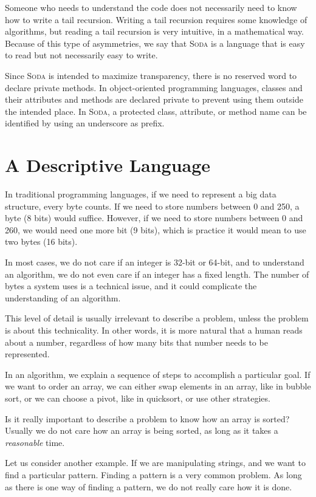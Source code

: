 \documentclass[12pt,a4paper]{book}
\newcommand{\Soda}{\textsc{Soda}\xspace}
\begin{document}
    Someone who needs to understand the code does not necessarily need to know how to write a tail recursion.
    Writing a tail recursion requires some knowledge of algorithms, but reading a tail recursion is very intuitive, in a mathematical way.
    Because of this type of asymmetries, we say that \Soda is a language that is easy to read but not necessarily easy to write.

    Since \Soda is intended to maximize transparency, there is no reserved word to declare private methods.
    In object-oriented programming languages, classes and their attributes and methods are declared private to prevent using them outside the intended place.
    In \Soda, a protected class, attribute, or method name can be identified by using an underscore as prefix.


    \section{A Descriptive Language}

    In traditional programming languages, if we need to represent a big data structure, every byte counts.
    If we need to store numbers between 0 and 250, a byte (8 bits) would suffice.
    However, if we need to store numbers between 0 and 260, we would need one more bit (9 bits), which is practice it would mean to use two bytes (16 bits).

    In most cases, we do not care if an integer is 32-bit or 64-bit, and to understand an algorithm, we do not even care if an integer has a fixed length.
    The number of bytes a system uses is a technical issue, and it could complicate the understanding of an algorithm.

    This level of detail is usually irrelevant to describe a problem, unless the problem is about this technicality.
    In other words, it is more natural that a human reads about a number, regardless of how many bits that number needs to be represented.

    In an algorithm, we explain a sequence of steps to accomplish a particular goal.
    If we want to order an array, we can either swap elements in an array, like in bubble sort, or we can choose a pivot, like in quicksort, or use other strategies.

    Is it really important to describe a problem to know how an array is sorted?
    Usually we do not care how an array is being sorted, as long as it takes a \textit{reasonable} time.

    Let us consider another example.
    If we are manipulating strings, and we want to find a particular pattern.
    Finding a pattern is a very common problem.
    As long as there is one way of finding a pattern, we do not really care how it is done.
\end{document}
